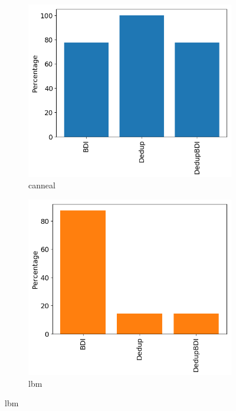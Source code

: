 \begin{figure}
    \begin{subfigure}{0.5\textwidth}
        \includegraphics[width=\textwidth]{canneal.png}
        \caption{canneal}
        \label{fig:canneal}
    \end{subfigure}
    \begin{subfigure}{0.5\textwidth}
        \includegraphics[width=\textwidth]{lbm.png}
        \caption{lbm}
        \label{fig:lbm}
    \end{subfigure}

\end{figure}
